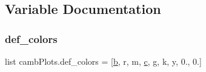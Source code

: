 \subsection{Variable Documentation}
\mbox{\label{namespacecambPlots_ac3e5045bfeb5c7c0e5dfc22c4eae07a8}} 
\subsubsection{\texorpdfstring{def\+\_\+colors}{def\_colors}}
{\footnotesize\ttfamily list camb\+Plots.\+def\+\_\+colors = \mbox{[}\textquotesingle{}\mbox{\hyperlink{plotTT_8m_ac0431efac4d7c393d1e70b86115cb93f}{b}}\textquotesingle{}, \textquotesingle{}r\textquotesingle{}, \textquotesingle{}m\textquotesingle{}, \textquotesingle{}\mbox{\hyperlink{plotTT_8m_ad9d1ac02e33c4aed62ad517a7cb8b3fb}{c}}\textquotesingle{}, \textquotesingle{}g\textquotesingle{}, \textquotesingle{}k\textquotesingle{}, \textquotesingle{}y\textquotesingle{}, \textquotesingle{}0.\textquotesingle{}, \textquotesingle{}0.\textquotesingle{}\mbox{]}}

